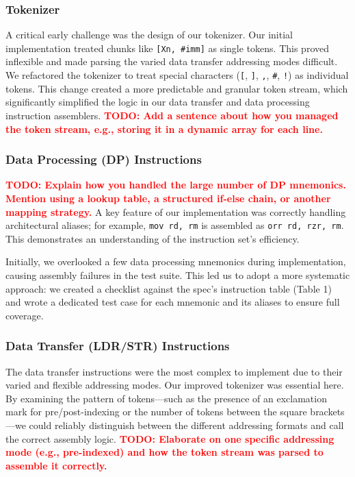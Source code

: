 \documentclass[11pt]{article}
\newcommand{\todo}[1]{\textcolor{red}{\textbf{TODO: #1}}}
\begin{document}
\subsubsection{Tokenizer}
A critical early challenge was the design of our tokenizer. Our initial implementation treated chunks like \texttt{[Xn, \#imm]} as single tokens. This proved inflexible and made parsing the varied data transfer addressing modes difficult. We refactored the tokenizer to treat special characters (\texttt{[}, \texttt{]}, \texttt{,}, \texttt{\#}, \texttt{!}) as individual tokens. This change created a more predictable and granular token stream, which significantly simplified the logic in our data transfer and data processing instruction assemblers.
\todo{Add a sentence about how you managed the token stream, e.g., storing it in a dynamic array for each line.}

\subsubsection{Data Processing (DP) Instructions}
\todo{Explain how you handled the large number of DP mnemonics. Mention using a lookup table, a structured if-else chain, or another mapping strategy.}
A key feature of our implementation was correctly handling architectural aliases; for example, \texttt{mov rd, rm} is assembled as \texttt{orr rd, rzr, rm}. This demonstrates an understanding of the instruction set's efficiency.

Initially, we overlooked a few data processing mnemonics during implementation, causing assembly failures in the test suite. This led us to adopt a more systematic approach: we created a checklist against the spec's instruction table (Table 1) and wrote a dedicated test case for each mnemonic and its aliases to ensure full coverage.

\subsubsection{Data Transfer (LDR/STR) Instructions}
The data transfer instructions were the most complex to implement due to their varied and flexible addressing modes. Our improved tokenizer was essential here. By examining the pattern of tokens---such as the presence of an exclamation mark for pre/post-indexing or the number of tokens between the square brackets---we could reliably distinguish between the different addressing formats and call the correct assembly logic.
\todo{Elaborate on one specific addressing mode (e.g., pre-indexed) and how the token stream was parsed to assemble it correctly.}
\end{document}
